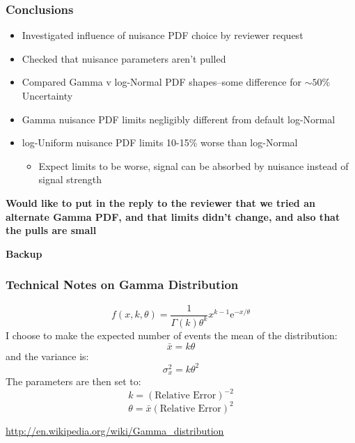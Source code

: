 \documentclass{hugontalk}
\begin{document}
\begin{frame}
\frametitle{Conclusions}
\begin{itemize}
  \item Investigated influence of nuisance PDF choice by reviewer request
  \item Checked that nuisance parameters aren't pulled
  \item Compared Gamma v log-Normal PDF shapes--some difference for $\sim 50\%$ Uncertainty
  \item Gamma nuisance PDF limits negligibly different from default log-Normal
  \item log-Uniform nuisance PDF limits 10-15\% worse than log-Normal
  \begin{itemize}
    \item Expect limits to be worse, signal can be absorbed by nuisance instead of signal strength
  \end{itemize}
\end{itemize}
\begin{center}
\textbf{Would like to put in the reply to the reviewer that we tried an alternate Gamma PDF, and that limits didn't change, and also that the pulls are small}
\end{center}
\end{frame}

\begin{frame}
\begin{center}
\huge
\textbf{Backup}
\end{center}
\end{frame}

\begin{frame}
\frametitle{Technical Notes on Gamma Distribution}
\begin{equation}
  f(x,k,\theta) = \frac{1}{\Gamma(k)\theta^k} x^{k-1} \mathrm{e}^{-x/\theta}
\end{equation}
I choose to make the expected number of events the mean of the distribution:
\begin{equation}
\bar{x} = k\theta
\end{equation}
and the variance is:
\begin{equation}
\sigma_{x}^2 = k\theta^2
\end{equation}
The parameters are then set to:
\begin{equation}
k = (\text{Relative Error})^{-2}
\end{equation}
\begin{equation}
\theta =  \bar{x} (\text{Relative Error})^2
\end{equation}


\begin{center}
\textcolor{blue}{\tiny\underline{\url{http://en.wikipedia.org/wiki/Gamma\_distribution}}}
\end{center}

\end{frame}
\end{document}
